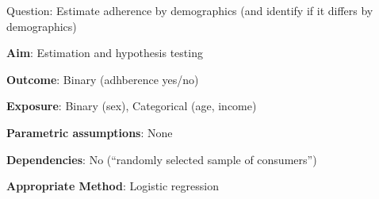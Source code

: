 \documentclass[12pt,]{article}
\begin{document}
Question: Estimate adherence by demographics (and identify if it differs
by demographics)

\textbf{Aim}: Estimation and hypothesis testing

\textbf{Outcome}: Binary (adhberence yes/no)

\textbf{Exposure}: Binary (sex), Categorical (age, income)

\textbf{Parametric assumptions}: None

\textbf{Dependencies}: No (``randomly selected sample of consumers'')

\textbf{Appropriate Method}: Logistic regression


\end{document}
